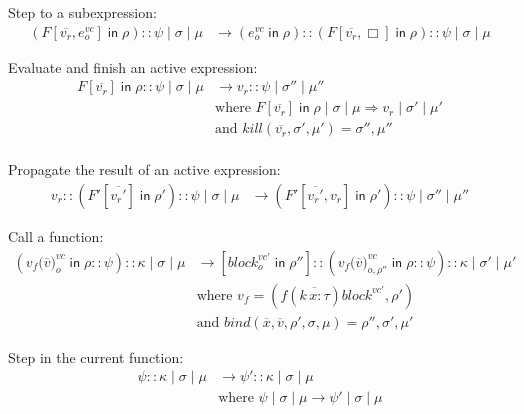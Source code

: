 \documentclass{article}
\newcommand{\LP}{\texttt{(}}
\newcommand{\RP}{\texttt{)}}
\newcommand{\IN}{\mathop{\mathsf{in}}}
\newcommand{\INCTX}[4]{\boxed{#1}^{#2}_{#3} \IN #4}
\begin{document}
\noindent Step to a subexpression:
\begin{align*}
  (F[\overline{v_r},\boxed{e}^\mathit{vc}_o] \IN \rho) :: \psi \mid \sigma \mid \mu
  &\longrightarrow
  (\boxed{e}^\mathit{vc}_o \IN \rho) :: (F[\overline{v_r},\Box] \IN \rho) :: \psi
  \mid \sigma \mid \mu
\end{align*}

\noindent Evaluate and finish an active expression:
\begin{align*}
F[\overline{v_r}] \IN \rho :: \psi \mid \sigma \mid \mu
 & \longrightarrow v_r :: \psi \mid \sigma'' \mid \mu''\\
& \text{where }
  F[\overline{v_r}] \IN \rho \mid \sigma \mid \mu \Rightarrow v_r \mid \sigma' \mid \mu'\\
& \text{and } \mathit{kill}(\overline{v_r}, \sigma', \mu') = \sigma'', \mu''\\  
\end{align*}

\noindent Propagate the result of an active expression:
\begin{align*}
v_r :: (F'[\overline{v_{r}'}] \IN \rho'):: \psi \mid \sigma \mid \mu
 & \longrightarrow
(F'[\overline{v_{r}'}, v_r] \IN \rho') :: \psi \mid \sigma'' \mid \mu''
\end{align*}

\begin{center}
\fbox{$\kappa \mid \sigma \mid \mu \longrightarrow \kappa \mid \sigma \mid \mu$}
\end{center}

\noindent Call a function:
\begin{align*}
  (\INCTX{v_f\LP\overline{v}\RP}{vc}{o}{\rho} :: \psi) :: \kappa
  \mid \sigma \mid \mu
  & \longrightarrow
  [\INCTX{\mathit{block}}{vc'}{o}{\rho''}]
  :: (\INCTX{v_f\LP\overline{v}\RP}{vc}{o,\rho''}{\rho} :: \psi)
  :: \kappa \mid \sigma' \mid \mu' \\
  & \text{where } v_f = (f(\overline{k\, x : \tau}) \mathit{block}^{vc'}, \rho')\\
  & \text{and } \mathit{bind}( \overline{x},\overline{v},\rho',\sigma,\mu)
    = \rho'', \sigma', \mu'
\end{align*}

\noindent Step in the current function:
\begin{align*}
  \psi :: \kappa \mid \sigma \mid \mu
   &\longrightarrow
  \psi' :: \kappa \mid \sigma \mid \mu \\
  & \text{where } 
  \psi \mid \sigma \mid \mu \longrightarrow \psi' \mid \sigma \mid \mu 
\end{align*}
\end{document}
